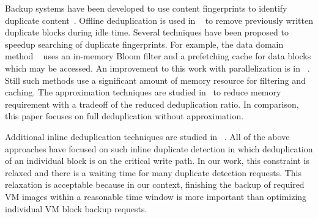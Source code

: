 Backup systems have been developed to use content fingerprints to identify duplicate
content~\cite{venti02,Rhea2008}.
Offline deduplication is used in ~\cite{EMC,NetAppOffline} to remove previously written duplicate blocks during idle time.
Several techniques have been proposed to speedup searching of duplicate
fingerprints. For example, the data domain method ~\cite{bottleneck08} 
uses  an in-memory Bloom filter and a prefetching cache for data blocks  which may be
accessed.  An improvement to this work with parallelization is in ~\cite{MAD210,DEBAR}.
Still such methods use  a significant amount of memory resource for filtering and caching.
The approximation techniques are studied in~\cite{extreme_binning09,WeiZhangIEEE}  
to reduce memory requirement with a tradeoff of the reduced deduplication ratio.
In comparison, this paper focuses on  full deduplication without approximation.

Additional inline deduplication techniques are studied in ~\cite{sparseindex09,Guo2011,idedup}. 
All of the above approaches have focused on
such inline duplicate detection in which  deduplication of an individual block  is on the critical write path.
In our work, this constraint is relaxed and 
there is a waiting time for many duplicate detection requests. This relaxation is acceptable because 
in our context, finishing the backup of required VM images within a reasonable time window is more
important than optimizing individual VM block  backup requests.




